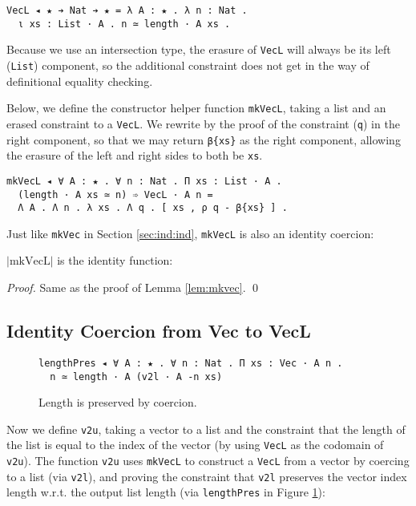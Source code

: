 \documentclass[a4paper,envcountsame,envcountsect]{llncs}
\newcommand{\refsec}[1]{Section \ref{sec:#1}}
\newcommand{\labsec}[1]{\label{sec:#1}}
\newcommand{\reffig}[1]{Figure \ref{fig:#1}}
\newcommand{\labfig}[1]{\label{fig:#1}}
\newcommand{\reflem}[1]{Lemma \ref{lem:#1}}
\newcommand{\lablem}[1]{\label{lem:#1}}
\newcommand{\erase}[1]{\ensuremath{\lvert #1 \rvert}}
\newcommand{\name}[1]{\textrm{#1}}
\begin{document}
\begin{verbatim}
VecL ◂ ★ ➔ Nat ➔ ★ = λ A : ★ . λ n : Nat .
  ι xs : List · A . n ≃ length · A xs .
\end{verbatim}

Because we use an intersection type, the erasure of \texttt{VecL} will
always be its left (\texttt{List}) component, so the additional
constraint does not get in the way of definitional equality
checking.

Below, we define the constructor helper function \texttt{mkVecL},
taking a list and an erased constraint to a \texttt{VecL}.
We rewrite by the proof of the constraint (\texttt{q}) in the right
component, so that we may return \texttt{β\{xs\}} as the right
component, allowing the erasure of the left and right sides to both be
\texttt{xs}.

\begin{verbatim}
mkVecL ◂ ∀ A : ★ . ∀ n : Nat . Π xs : List · A .
  (length · A xs ≃ n) ➾ VecL · A n =
  Λ A . Λ n . λ xs . Λ q . [ xs , ρ q - β{xs} ] .
\end{verbatim}

Just like \texttt{mkVec} in \refsec{ind:ind}, \texttt{mkVecL} is also
an identity coercion:

\begin{lemma}
\erase{\name{mkVecL}} is the identity function:
\lablem{mkvecl}
\end{lemma}

\begin{proof}
{\small
Same as the proof of \reflem{mkvec}. \qed
}
\end{proof}

\subsection{Identity Coercion from Vec to VecL}
\labsec{listreuse:v2u}

\begin{figure}[t]
\centering
\begin{verbatim}
lengthPres ◂ ∀ A : ★ . ∀ n : Nat . Π xs : Vec · A n .
  n ≃ length · A (v2l · A -n xs)
\end{verbatim}
\caption{Length is preserved by coercion.}
\labfig{lenpres}
\end{figure}

Now we define \texttt{v2u}, taking a vector to a list and the constraint
that the length of the list is equal to the index of the vector
(by using \texttt{VecL} as the codomain of \texttt{v2u}). The function
\texttt{v2u} uses \texttt{mkVecL} to construct a \texttt{VecL} from a
vector by coercing to a list (via \texttt{v2l}), and proving the
constraint that \texttt{v2l} preserves the vector index length
w.r.t. the output list length
(via \texttt{lengthPres} in \reffig{lenpres}):
\end{document}
